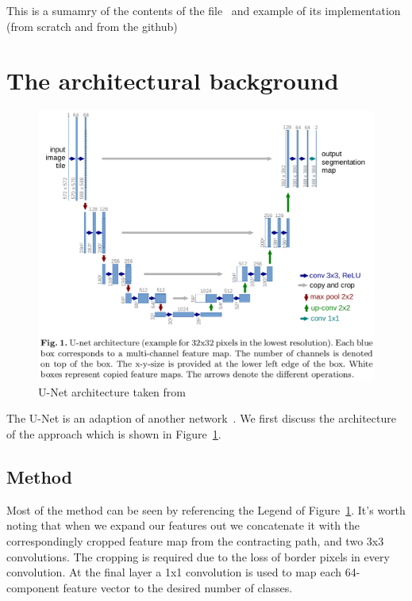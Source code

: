 \documentclass[11pt]{article}
\begin{document}


\tableofcontents

\clearpage

This is a sumamry of the contents of the file~\cite{U-Net} and example of its implementation (from scratch and from the github)

\section{The architectural background} 

\begin{figure}[H]
    \centering
    \includegraphics[width=\linewidth]{images/u-net.png}
    \caption{U-Net architecture taken from~\cite{U-Net}}
   \label{fig:u-net-architecture}
\end{figure}

The U-Net is an adaption of another network~\cite{fully-CNNs-for-semantic-segmentation}. We first discuss the architecture of the approach which is shown in Figure~\ref{fig:u-net-architecture}.

\subsection{Method}

Most of the method can be seen by referencing the Legend of Figure~\ref{fig:u-net-architecture}. It's worth noting that when we expand our features out we concatenate it with the correspondingly cropped feature map from the contracting path, and two 3x3 convolutions. The cropping is required due to the loss of border pixels in every convolution. At the final layer a 1x1 convolution is used to map each 64-component feature vector to the desired number of classes.
\end{document}
